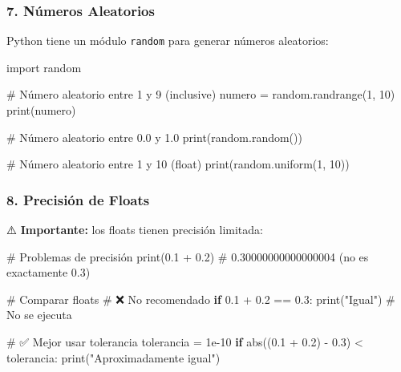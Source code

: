 \documentclass[
  doc,
  floatsintext,
  longtable,
  a4paper,
  nolmodern,
  notxfonts,
  notimes,
  12pt,
  colorlinks=true,linkcolor=blue,citecolor=blue,urlcolor=blue]{apa7}
\newenvironment{Shaded}{\begin{snugshade}}{\end{snugshade}}
\newcommand{\BuiltInTok}[1]{\textcolor[rgb]{0.00,0.23,0.31}{#1}}
\newcommand{\CommentTok}[1]{\textcolor[rgb]{0.37,0.37,0.37}{#1}}
\newcommand{\ControlFlowTok}[1]{\textcolor[rgb]{0.00,0.23,0.31}{\textbf{#1}}}
\newcommand{\DecValTok}[1]{\textcolor[rgb]{0.68,0.00,0.00}{#1}}
\newcommand{\FloatTok}[1]{\textcolor[rgb]{0.68,0.00,0.00}{#1}}
\newcommand{\ImportTok}[1]{\textcolor[rgb]{0.00,0.46,0.62}{#1}}
\newcommand{\NormalTok}[1]{\textcolor[rgb]{0.00,0.23,0.31}{#1}}
\newcommand{\OperatorTok}[1]{\textcolor[rgb]{0.37,0.37,0.37}{#1}}
\newcommand{\StringTok}[1]{\textcolor[rgb]{0.13,0.47,0.30}{#1}}
\begin{document}
\subsubsection{7. Números Aleatorios}\label{nuxfameros-aleatorios}

Python tiene un módulo \texttt{random} para generar números aleatorios:

\begin{Shaded}
\begin{Highlighting}[]
\ImportTok{import}\NormalTok{ random}

\CommentTok{\# Número aleatorio entre 1 y 9 (inclusive)}
\NormalTok{numero }\OperatorTok{=}\NormalTok{ random.randrange(}\DecValTok{1}\NormalTok{, }\DecValTok{10}\NormalTok{)}
\BuiltInTok{print}\NormalTok{(numero)}

\CommentTok{\# Número aleatorio entre 0.0 y 1.0}
\BuiltInTok{print}\NormalTok{(random.random())}

\CommentTok{\# Número aleatorio entre 1 y 10 (float)}
\BuiltInTok{print}\NormalTok{(random.uniform(}\DecValTok{1}\NormalTok{, }\DecValTok{10}\NormalTok{))}
\end{Highlighting}
\end{Shaded}

\subsubsection{8. Precisión de Floats}\label{precisiuxf3n-de-floats}

⚠️ \textbf{Importante:} los floats tienen precisión limitada:

\begin{Shaded}
\begin{Highlighting}[]
\CommentTok{\# Problemas de precisión}
\BuiltInTok{print}\NormalTok{(}\FloatTok{0.1} \OperatorTok{+} \FloatTok{0.2}\NormalTok{)  }\CommentTok{\# 0.30000000000000004 (no es exactamente 0.3)}

\CommentTok{\# Comparar floats}
\CommentTok{\# ❌ No recomendado}
\ControlFlowTok{if} \FloatTok{0.1} \OperatorTok{+} \FloatTok{0.2} \OperatorTok{==} \FloatTok{0.3}\NormalTok{:}
    \BuiltInTok{print}\NormalTok{(}\StringTok{"Igual"}\NormalTok{)  }\CommentTok{\# No se ejecuta}

\CommentTok{\# ✅ Mejor usar tolerancia}
\NormalTok{tolerancia }\OperatorTok{=} \FloatTok{1e{-}10}
\ControlFlowTok{if} \BuiltInTok{abs}\NormalTok{((}\FloatTok{0.1} \OperatorTok{+} \FloatTok{0.2}\NormalTok{) }\OperatorTok{{-}} \FloatTok{0.3}\NormalTok{) }\OperatorTok{\textless{}}\NormalTok{ tolerancia:}
    \BuiltInTok{print}\NormalTok{(}\StringTok{"Aproximadamente igual"}\NormalTok{)}
\end{Highlighting}
\end{Shaded}
\end{document}
